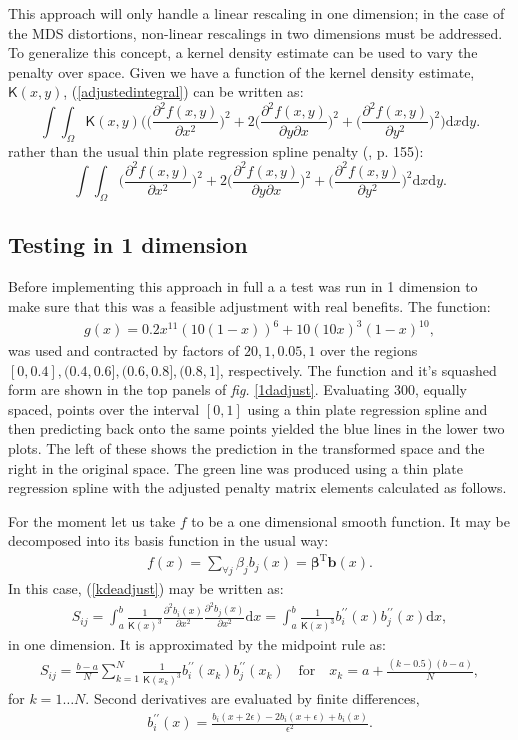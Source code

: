 \documentclass[a4paper,10pt]{article}
\newcommand{\fig}[1]{\emph{fig.} \ref{#1}}
\newcommand{\eqn}[1]{(\ref{#1})}
\newcommand{\tr}[1]{#1^{\text{T}}}
\newcommand{\be}{\begin{eqnarray}}
\newcommand{\ee}{\end{eqnarray}}
\newcommand{\tprs}{thin plate regression spline }
\begin{document}
This approach will only handle a linear rescaling in one dimension; in the case of the MDS distortions, non-linear rescalings in two dimensions must be addressed. To generalize this concept, a kernel density estimate can be used to vary the penalty over space. Given we have a function of the kernel density estimate, $\mathsf{K}(x,y)$, \eqn{adjustedintegral} can be written as:
\begin{equation}
\int\int_\Omega \mathsf{K}(x,y) \Big( \Big(\frac{\partial^2 f(x,y)}{\partial x^2}\Big)^2 + 2\Big(\frac{\partial^2 f(x,y)}{\partial y \partial x}\Big)^2 + \Big(\frac{\partial^2 f(x,y)}{\partial y^2}\Big)^2\Big) \text{d}x\text{d}y.
\label{kdeadjust}
\end{equation}
rather than the usual thin plate regression spline penalty (\cite{simonbook}, p. 155):
\begin{equation}
\int\int_\Omega \Big(\frac{\partial^2 f(x,y)}{\partial x^2}\Big)^2 + 2\Big(\frac{\partial^2 f(x,y)}{\partial y \partial x}\Big)^2 + \Big(\frac{\partial^2 f(x,y)}{\partial y^2}\Big)^2 \text{d}x\text{d}y.
\end{equation}


\subsection{Testing in 1 dimension}

Before implementing this approach in full a a test was run in 1 dimension to make sure that this was a feasible adjustment with real benefits. The function:
\be
g(x)=0.2x^{11}(10(1-x))^6+10(10x)^3(1-x)^{10},
\ee
was used and contracted by factors of $20,1,0.05,1$ over the regions $[0,0.4], (0.4,0.6],(0.6,0.8],(0.8,1]$, respectively. The function and it's squashed form are shown in the top panels of \fig{1dadjust}. Evaluating 300, equally spaced, points over the interval $[0,1]$ using a thin plate regression spline and then predicting back onto the same points yielded the blue lines in the lower two plots. The left of these shows the prediction in the transformed space and the right in the original space. The green line was produced using a \tprs with the adjusted penalty matrix elements calculated as follows.

For the moment let us take $f$ to be a one dimensional smooth function. It may be decomposed into its basis function in the usual way:
\be
f(x)=\sum_{\forall j} \beta_j b_j(x) = \tr{\mathbf{\beta}}\mathbf{b}(x).
\ee
In this case, \eqn{kdeadjust} may be written as:
\be
S_{ij}= \int_a^b \frac{1}{\mathsf{K}(x)^3} \frac{\partial^2 b_i(x)}{\partial x^2}\frac{\partial^2 b_j(x)}{\partial x^2} \text{d}x = \int_a^b \frac{1}{\mathsf{K}(x)^3} b^{\prime\prime}_i(x) b^{\prime\prime}_j(x) \text{d}x,
\ee
in one dimension. It is approximated by the midpoint rule as:
\be
S_{ij}= \frac{b-a}{N}\sum_{k=1}^N \frac{1}{\mathsf{K}(x_k)^3} b^{\prime\prime}_i(x_k) b^{\prime\prime}_j(x_k) \quad \text{for} \quad x_k=a+\frac{(k-0.5)(b-a)}{N},
\ee
for $k=1\dots N$. Second derivatives are evaluated by finite differences,
\be
\label{bfinitediff}
b^{\prime\prime}_i(x) = \frac{ b_i(x+2\epsilon) - 2b_i(x+\epsilon) + b_i(x)}{\epsilon^2}.
\ee
\end{document}
